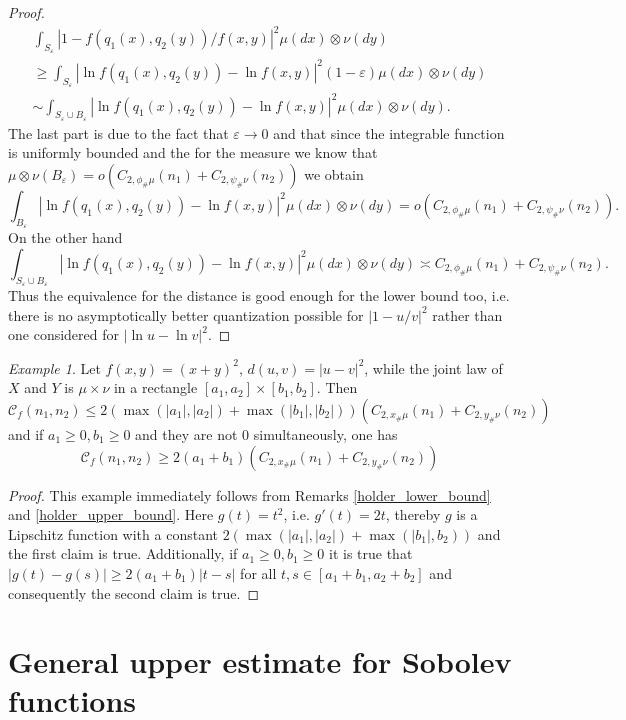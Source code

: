 \documentclass{amsart}
\theoremstyle{remark}
\newtheorem{example}[theorem]{Example}
\numberwithin{equation}{section}
\numberwithin{figure}{section}
\def\eps{\varepsilon}
\begin{document}
\begin{proof}
	\begin{eqnarray*}
	\int_{S_\eps} |1- f(q_1(x), q_2(y))/f(x, y)|^2 \mu(dx) \otimes \nu(dy) 
	\\ \geq \int_{S_{\eps}} |\ln f(q_1(x), q_2(y)) - \ln f(x, y)|^2 (1-\eps) \mu(dx) \otimes \nu(dy)
	\\ \sim \int_{S_{\eps}\cup B_{\eps}} |\ln f(q_1(x), q_2(y)) - \ln f(x, y)|^2 \mu(dx) \otimes \nu(dy).
	\end{eqnarray*}
The last part is due to the fact that $\eps \to 0$ and that since the integrable function is uniformly bounded and the for the measure we know that $\mu \otimes \nu(B_\eps) = o(C_{2,\phi_\#\mu}(n_1) + C_{2,\psi_\#\nu}(n_2))$ we obtain
\[
\int_{B_{\eps}} |\ln f(q_1(x), q_2(y)) - \ln f(x, y)|^2 \mu(dx) \otimes \nu(dy) = o(C_{2,\phi_\#\mu}(n_1) + C_{2,\psi_\#\nu}(n_2)).
\]
On the other hand
\[
\int_{S_{\eps}\cup B_{\eps}} |\ln f(q_1(x), q_2(y)) - \ln f(x, y)|^2 \mu(dx) \otimes \nu(dy) \asymp C_{2,\phi_\#\mu}(n_1) + C_{2,\psi_\#\nu}(n_2).
\]
Thus the equivalence for the distance is good enough for the lower bound too, i.e. there is no asymptotically better quantization possible for $|1-u/v|^2$ rather than one considered for $|\ln u - \ln v|^2$.
\end{proof}

\begin{example}
	Let $f(x, y) = (x+y)^2$, $d(u, v) = |u-v|^2$, while the joint law of $X$ and $Y$ is $\mu \times \nu$ in a rectangle $[a_1, a_2] \times [b_1, b_2]$. Then 
	\[
	\mathcal{C}_f (n_1, n_2) \leq 2 (\max (|a_1|, |a_2|) + \max (|b_1|,  |b_2|)) (C_{2, x_\#\mu}(n_1) + C_{2, y_\#\nu}(n_2))
	\]
	and if $a_1\geq 0, b_1 \geq 0$ and they are not $0$ simultaneously, one has
	\[
	\mathcal{C}_f (n_1, n_2) \geq 2 (a_1 + b_1) (C_{2, x_\#\mu}(n_1) + C_{2, y_\#\nu}(n_2))
	\]
\end{example}	

\begin{proof}
	This example immediately follows from Remarks \ref{holder_lower_bound} and \ref{holder_upper_bound}. Here $g(t) = t^2$, i.e. $g'(t) = 2t$, thereby $g$ is a Lipschitz function with a constant $2(\max (|a_1|, |a_2|) + \max (|b_1|, b_2))$ and the first claim is true. Additionally, if $a_1 \geq 0, b_1 \geq 0$ it is true that $|g(t) - g(s)| \geq 2(a_1+b_1)|t-s|$ for all $t, s \in [a_1 + b_1, a_2+b_2]$ and consequently the second claim is true.
\end{proof}



\section{General upper estimate for Sobolev functions}
	
\end{document}
